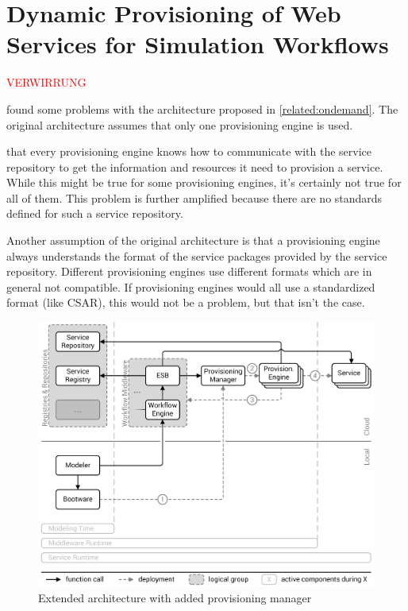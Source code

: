\section{Dynamic Provisioning of Web Services for Simulation Workflows}
\label{related:dynamic}

\textcolor{red}{VERWIRRUNG}

\citeauthor{provisioning:dynamic} found some problems with the architecture proposed in \autoref{related:ondemand}.
The original architecture assumes that only one provisioning engine is used.

that every provisioning engine knows how to communicate with the service repository to get the information and resources it need to provision a service.
While this might be true for some provisioning engines, it's certainly not true for all of them.
This problem is further amplified because there are no standards defined for such a service repository.

Another assumption of the original architecture is that a provisioning engine always understands the format of the service packages provided by the service repository.
Different provisioning engines use different formats which are in general not compatible.
If provisioning engines would all use a standardized format (like CSAR), this would not be a problem, but that isn't the case.

\begin{figure}[!htbp]
	\centering
	\includegraphics[resolution=600]{related/assets/valeri_architecture}
	\caption{Extended architecture with added provisioning manager~\autocite[based on][]{provisioning:dynamic}}
	\label{image:valeri_architecture}
\end{figure}

